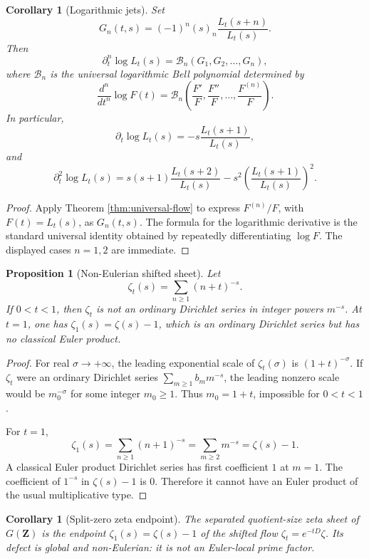 \documentclass[11pt]{article}
\newcommand{\Z}{\mathbf Z}
\theoremstyle{plain}
\newtheorem{proposition}[theorem]{Proposition}
\newtheorem{corollary}[theorem]{Corollary}
\theoremstyle{definition}
\numberwithin{equation}{section}
\begin{document}
\begin{corollary}[Logarithmic jets]\label{cor:log-jets}
Set
\[
 G_n(t,s)=(-1)^n(s)_n\frac{L_t(s+n)}{L_t(s)}.
\]
Then
\[
 \partial_t^n\log L_t(s)=\mathcal B_n(G_1,G_2,\ldots,G_n),
\]
where \(\mathcal B_n\) is the universal logarithmic Bell polynomial determined by
\[
 \frac{d^n}{dt^n}\log F(t)=\mathcal B_n\left(\frac{F'}F,\frac{F''}F,\ldots,\frac{F^{(n)}}F\right).
\]
In particular,
\[
 \partial_t\log L_t(s)=-s\frac{L_t(s+1)}{L_t(s)},
\]
and
\[
 \partial_t^2\log L_t(s)=s(s+1)\frac{L_t(s+2)}{L_t(s)}-s^2\left(\frac{L_t(s+1)}{L_t(s)}\right)^2.
\]
\end{corollary}

\begin{proof}
Apply Theorem \ref{thm:universal-flow} to express \(F^{(n)}/F\), with \(F(t)=L_t(s)\), as \(G_n(t,s)\).  The formula for the logarithmic derivative is the standard universal identity obtained by repeatedly differentiating \(\log F\).  The displayed cases \(n=1,2\) are immediate.
\end{proof}

\begin{proposition}[Non-Eulerian shifted sheet]\label{prop:non-euler}
Let
\[
 \zeta_t(s)=\sum_{n\ge1}(n+t)^{-s}.
\]
If \(0<t<1\), then \(\zeta_t\) is not an ordinary Dirichlet series in integer powers \(m^{-s}\).  At \(t=1\), one has \(\zeta_1(s)=\zeta(s)-1\), which is an ordinary Dirichlet series but has no classical Euler product.
\end{proposition}

\begin{proof}
For real \(\sigma\to+\infty\), the leading exponential scale of \(\zeta_t(\sigma)\) is \((1+t)^{-\sigma}\).  If \(\zeta_t\) were an ordinary Dirichlet series \(\sum_{m\ge1}b_m m^{-s}\), the leading nonzero scale would be \(m_0^{-\sigma}\) for some integer \(m_0\ge1\).  Thus \(m_0=1+t\), impossible for \(0<t<1\).

For \(t=1\),
\[
 \zeta_1(s)=\sum_{n\ge1}(n+1)^{-s}=\sum_{m\ge2}m^{-s}=\zeta(s)-1.
\]
A classical Euler product Dirichlet series has first coefficient \(1\) at \(m=1\).  The coefficient of \(1^{-s}\) in \(\zeta(s)-1\) is \(0\).  Therefore it cannot have an Euler product of the usual multiplicative type.
\end{proof}

\begin{corollary}[Split-zero zeta endpoint]
The separated quotient-size zeta sheet of \(G(\Z)\) is the endpoint \(\zeta_1(s)=\zeta(s)-1\) of the shifted flow \(\zeta_t=e^{-tD}\zeta\).  Its defect is global and non-Eulerian: it is not an Euler-local prime factor.
\end{corollary}
\end{document}
